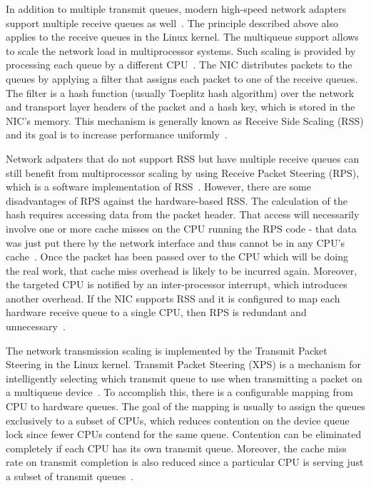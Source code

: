 In addition to multiple transmit queues,
modern high-speed network adapters support multiple receive queues as well~\cite{mellanox-product-brief}.
The principle described above also applies to the receive queues in the Linux kernel.
The multiqueue support allows to scale the network load in multiprocessor systems.
Such scaling is provided by processing each queue by a different CPU~\cite{kernel-doc-scaling}.
The NIC distributes packets to the queues by applying a filter that assigns each packet to one of the receive queues.
The filter is a hash function (usually Toeplitz hash algorithm) over the network and transport layer headers of the packet
and a hash key, which is stored in the NIC's memory.
This mechanism is generally known as Receive Side Scaling (RSS)
and its goal is to increase performance uniformly~\cite{kernel-doc-scaling}.

Network adpaters that do not support RSS but have multiple receive queues can still benefit from multiprocessor scaling
by using Receive Packet Steering (RPS), which is a software implementation of RSS~\cite{kernel-doc-scaling}.
However, there are some disadvantages of RPS against the hardware-based RSS.
The calculation of the hash requires accessing data from the packet header.
That access will necessarily involve one or more cache misses on the CPU running the RPS code -
that data was just put there by the network interface and thus cannot be in any CPU's cache~\cite{receive-packet-steering}.
Once the packet has been passed over to the CPU which will be doing the real work,
that cache miss overhead is likely to be incurred again.
Moreover, the targeted CPU is notified by an inter-processor interrupt,
which introduces another overhead.
If the NIC supports RSS and it is configured to map each hardware
receive queue to a single CPU, then RPS is redundant and unnecessary~\cite{kernel-doc-scaling}.

The network transmission scaling is implemented by the
Transmit Packet Steering in the Linux kernel.
Transmit Packet Steering (XPS) is a mechanism for intelligently selecting
which transmit queue to use when transmitting a packet on a multiqueue device~\cite{kernel-source}.
To accomplish this, there is a configurable mapping from CPU to hardware queues.
The goal of the mapping is usually to assign the queues exclusively to a subset of CPUs, which reduces
contention on the device queue lock since fewer CPUs contend for the same queue.
Contention can be eliminated completely if each CPU has its own transmit queue.
Moreover, the cache miss rate on transmit completion is also reduced since a particular CPU
is serving just a subset of transmit queues~\cite{kernel-doc-scaling}.

